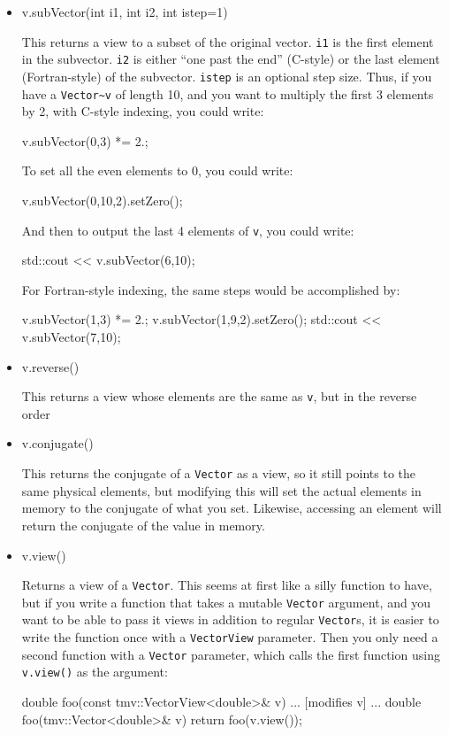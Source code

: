 \documentclass[twoside,letterpaper,11pt]{article}
\renewcommand{\tt}[1]{{\lstinline {#1}}}
\begin{document}
\begin{itemize}
\item
\begin{tmvcode}
v.subVector(int i1, int i2, int istep=1)
\end{tmvcode}
This returns a view to a subset of the original vector.
\tt{i1} is the first element in the subvector.
\tt{i2} is either ``one past the end'' (C-style) or the last element
(Fortran-style) of the subvector.
\tt{istep} is an optional step size.
Thus, if you have a \tt{Vector~v} of length 10, and you want to
multiply the first 3 elements by 2, with C-style indexing, you could write:
\begin{tmvcode}
v.subVector(0,3) *= 2.;
\end{tmvcode}
To set all the even elements to 0, you could write:
\begin{tmvcode}
v.subVector(0,10,2).setZero();
\end{tmvcode}
And then to output the last 4 elements of \tt{v}, you could write:
\begin{tmvcode}
std::cout << v.subVector(6,10);
\end{tmvcode}

For Fortran-style indexing, the same steps would be accomplished by:
\begin{tmvcode}
v.subVector(1,3) *= 2.;
v.subVector(1,9,2).setZero();
std::cout << v.subVector(7,10);
\end{tmvcode}

\item
\begin{tmvcode}
v.reverse()
\end{tmvcode}
This returns a view whose elements are the same as \tt{v},
but in the reverse order

\item
\begin{tmvcode}
v.conjugate()
\end{tmvcode}
This returns the conjugate of a \tt{Vector} as a view, so it still points
to the same physical elements, but modifying this will set the 
actual elements in memory to the conjugate of what you set.  Likewise,
accessing an element will return the conjugate of the value in memory.

\item
\begin{tmvcode}
v.view()
\end{tmvcode}
Returns a view of a \tt{Vector}.  This seems at first like a silly function to have, but
if you write a function that takes a mutable \tt{Vector} argument, and you want to
be able to pass it views in addition to regular \tt{Vector}s, it is easier to write the 
function once with a \tt{VectorView} parameter.  Then you only need a second 
function with a \tt{Vector} parameter, which calls the first function
using \tt{v.view()} as the argument:
\begin{tmvcode}
double foo(const tmv::VectorView<double>& v)
{ ... [modifies v] ... }
double foo(tmv::Vector<double>& v)
{ return foo(v.view()); }
\end{tmvcode}


\end{itemize}
\end{document}
